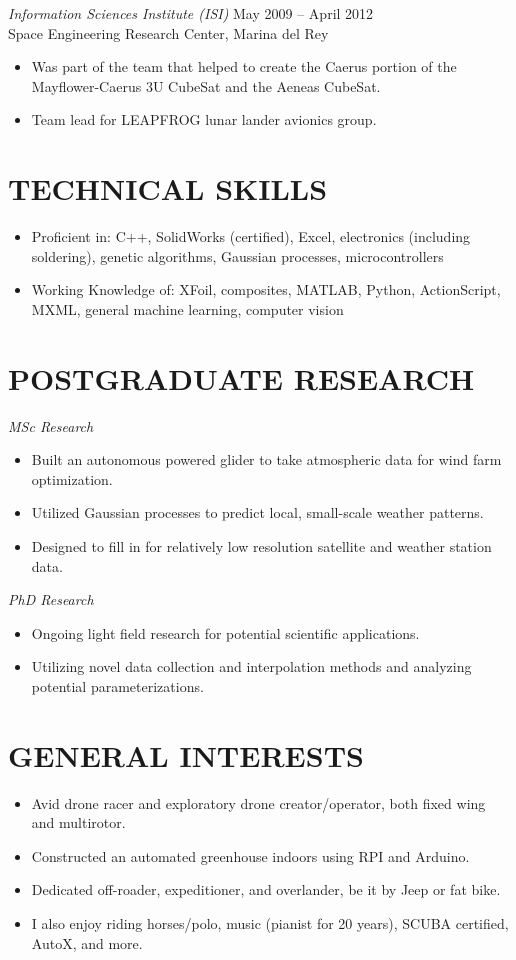 \documentclass[10pt]{res} %
\begin{document}
\begin{resume}
{\sl Information Sciences Institute (ISI)} \hfill May 2009 -- April 2012 \\
Space Engineering Research Center, Marina del Rey 
\begin{itemize}\itemsep -2pt
\item Was part of the team that helped to create the Caerus portion of the Mayflower-Caerus 3U CubeSat and the Aeneas CubeSat.
\item Team lead for LEAPFROG lunar lander avionics group.
\end{itemize}
\section{TECHNICAL SKILLS}
\begin{itemize} \itemsep -2pt
\item Proficient in: C++, SolidWorks (certified), Excel, electronics (including soldering), genetic algorithms, Gaussian processes, microcontrollers
\item Working Knowledge of: XFoil, composites, MATLAB, Python, ActionScript, MXML, general machine learning, computer vision
\end{itemize}

\section{POSTGRADUATE RESEARCH}
{\sl MSc Research}
\begin{itemize} \itemsep -2pt
\item Built an autonomous powered glider to take atmospheric data for wind farm optimization.
\item Utilized Gaussian processes to predict local, small-scale weather patterns.
\item Designed to fill in for relatively low resolution satellite and weather station data.
\end{itemize}
{\sl PhD Research}
\begin{itemize} \itemsep -2pt
\item Ongoing light field research for potential scientific applications.
\item Utilizing novel data collection and interpolation methods and analyzing potential parameterizations.
\end{itemize}
\section{GENERAL INTERESTS}
\begin{itemize} \itemsep -2pt
\item Avid drone racer and exploratory drone creator/operator, both fixed wing and multirotor. 
\item Constructed an automated greenhouse indoors using RPI and Arduino.
\item Dedicated off-roader, expeditioner, and overlander, be it by Jeep or fat bike.
\item I also enjoy riding horses/polo, music (pianist for 20 years), SCUBA certified, AutoX, and more.
\end{itemize}


\end{resume} 
\end{document}
